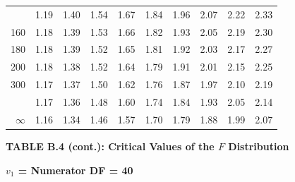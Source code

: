 \documentclass[10pt]{article}
\begin{document}
\begin{longtable}{@{}r!{\vrule width 0.8pt\hspace{0.55em}}rrrrrrrrr@{}}
 & 1.19 & 1.40 & 1.54 & 1.67 & 1.84 & 1.96 & 2.07 & 2.22 & 2.33 \\
160 & 1.18 & 1.39 & 1.53 & 1.66 & 1.82 & 1.93 & 2.05 & 2.19 & 2.30 \\
180 & 1.18 & 1.39 & 1.52 & 1.65 & 1.81 & 1.92 & 2.03 & 2.17 & 2.27 \\
200 & 1.18 & 1.38 & 1.52 & 1.64 & 1.79 & 1.91 & 2.01 & 2.15 & 2.25 \\
300 & 1.17 & 1.37 & 1.50 & 1.62 & 1.76 & 1.87 & 1.97 & 2.10 & 2.19 \\
 & 1.17 & 1.36 & 1.48 & 1.60 & 1.74 & 1.84 & 1.93 & 2.05 & 2.14 \\
$\infty$ & 1.16 & 1.34 & 1.46 & 1.57 & 1.70 & 1.79 & 1.88 & 1.99 & 2.07 \\
\end{longtable}
\newpage
\thispagestyle{empty}
\begin{center}
{\large\bfseries TABLE B.4 (cont.): Critical Values of the $F$ Distribution\par}
\end{center}
{\large\bfseries $v_1$ = Numerator DF = 40\par}
\vspace{0.5em}
\small
\end{document}
